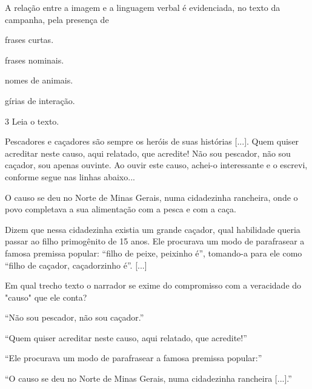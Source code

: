 A relação entre a imagem e a linguagem verbal é evidenciada, no texto da
campanha, pela presença de

\begin{escolha}
\item frases curtas.

\item frases nominais.

\item nomes de animais.

\item gírias de interação.
\end{escolha}

\num{3} Leia o texto.

\begin{myquote}
Pescadores e caçadores são sempre os heróis de suas histórias {[}...{]}.
Quem quiser acreditar neste causo, aqui relatado, que acredite! Não sou
pescador, não sou caçador, sou apenas ouvinte. Ao ouvir este causo,
achei-o interessante e o escrevi, conforme segue nas linhas abaixo...

O causo se deu no Norte de Minas Gerais, numa cidadezinha rancheira,
onde o povo completava a sua alimentação com a pesca e com a caça.

Dizem que nessa cidadezinha existia um grande caçador, qual habilidade
queria passar ao filho primogênito de 15 anos. Ele procurava um modo de
parafrasear a famosa premissa popular: ``filho de peixe, peixinho é'',
tomando-a para ele como ``filho de caçador, caçadorzinho é''. {[}...{]}

\end{myquote}

Em qual trecho texto o narrador se exime do compromisso com a veracidade
do "causo" que ele conta?

\begin{escolha}
\item ``Não sou pescador, não sou caçador.''

\item ``Quem quiser acreditar neste causo, aqui relatado, que acredite!''

\item ``Ele procurava um modo de parafrasear a famosa premissa popular:''

\item ``O causo se deu no Norte de Minas Gerais, numa cidadezinha rancheira
{[}...{]}.''
\end{escolha}

